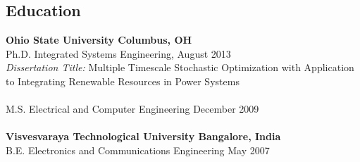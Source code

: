 \documentclass[hyperref, margin]{myResume}
\begin{document}
 


\address{3145 Dyer Street, Suite 337, Dallas, TX 75275\\Website: \url{gjharsha.github.io}}
\address{Email: \href{mailto:harsha@smu.edu}{harsha@smu.edu} \\ Phone: (214)-768-3076}
 
\begin{resume} 

\section{Education}
\textbf{Ohio State University \hfill Columbus, OH} \\
Ph.D. Integrated Systems Engineering, \hfill August 2013\\
\textit{Dissertation Title:} Multiple Timescale Stochastic Optimization with Application to Integrating Renewable Resources in Power Systems\\
\\
M.S. Electrical and Computer Engineering \hfill December 2009 \\
\\
\textbf{Visvesvaraya Technological University \hfill Bangalore, India}\\
B.E. Electronics and Communications Engineering \hfill May 2007


\end{resume}
\end{document}
